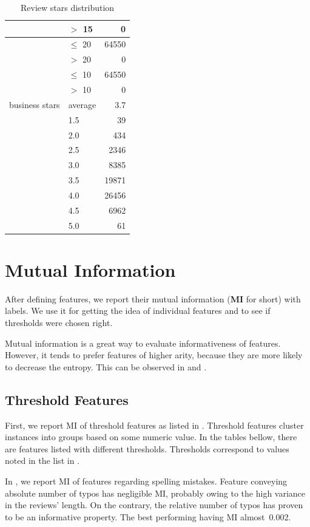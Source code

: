\begin{table}[h!]
\begin{tabular}{llr}
			& $>$ 15 & 0 \\
\midrule
			& $\le$ 20  & 64550 \\
			& $>$ 20 & 0 \\
\midrule
			& $\le$ 10  & 64550 \\
			& $>$ 10  & 0 \\
\midrule
business stars & average & 3.7 \\
 & 1.5 & 39 \\
 & 2.0 & 434 \\
 & 2.5 & 2346 \\
 & 3.0 & 8385 \\
 & 3.5 & 19871 \\
 & 4.0 & 26456 \\
 & 4.5 & 6962 \\
 & 5.0 & 61 \\
\bottomrule
\end{tabular}


\caption{Review stars distribution}\label{tab:star_distr}

\end{table}




\section{Mutual Information}\label{sec:mi}

After defining features, we report their mutual information (\textbf{MI} for short) with labels.
We use it for getting the idea of individual features and
to see if thresholds were chosen right.

Mutual information is a great way to evaluate informativeness of features.
However, it tends to prefer features of higher arity, because
they are more likely to decrease the entropy.
This can be observed in  and .


\subsection{Threshold Features}

First, we report MI of threshold features as listed in .
Threshold features cluster instances into groups based on some numeric value.
In the tables bellow, there are features listed with different thresholds.
Thresholds correspond to values noted in the list in .


In , we report MI of features regarding spelling mistakes.
Feature conveying absolute number of typos has negligible MI, probably owing to the high variance in the reviews' length.
On the contrary, the relative number of typos has proven to be an informative property.
The best performing having MI almost~0.002.

